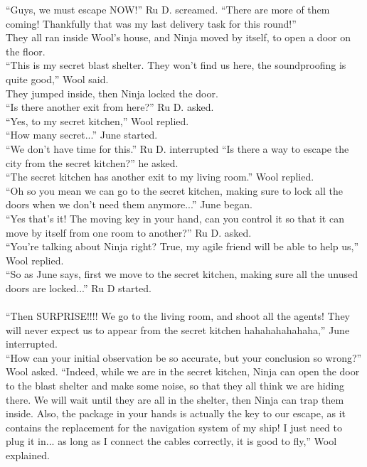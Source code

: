 ``Guys, we must escape NOW!'' Ru D. screamed. ``There are more of them coming! Thankfully that was my last delivery task for this round!''\\
They all ran inside Wool's house, and Ninja moved by itself, to open a door on the floor.\\
``This is my secret blast shelter. They won't find us here, the soundproofing is quite good,'' Wool said.\\
They jumped inside, then Ninja locked the door.\\
``Is there another exit from here?'' Ru D. asked.\\
``Yes, to my secret kitchen,'' Wool replied.\\
``How many secret...'' June started.\\
``We don't have time for this.'' Ru D. interrupted ``Is there a way to escape the city from the secret kitchen?'' he asked.\\
``The secret kitchen has another exit to my living room.'' Wool replied.\\
``Oh so you mean we can go to the secret kitchen, making sure to lock all the doors when we don't need them anymore...'' June began.\\
``Yes that's it! The moving key in your hand, can you control it so that it can move by itself from one room to another?'' Ru D. asked.\\
``You're talking about Ninja right? True, my agile friend will be able to help us,'' Wool replied.\\
``So as June says, first we move to the secret kitchen, making sure all the unused doors are locked...'' Ru D started.\\\\
\clearpage  %
``Then SURPRISE!!!! We go to the living room, and shoot all the agents! They will never expect us to appear from the secret kitchen hahahahahahaha,'' June interrupted.\\
``How can your initial observation be so accurate, but your conclusion so wrong?'' Wool asked. ``Indeed, while we are in the secret kitchen, Ninja can open the door to the blast shelter and make some noise, so that they all think we are hiding there. We will wait until they are all in the shelter, then Ninja can trap them inside. Also, the package in your hands is actually the key to our escape, as it contains the replacement for the navigation system of my ship! I just need to plug it in... as long as I connect the cables correctly, it is good to fly,'' Wool explained.\\
